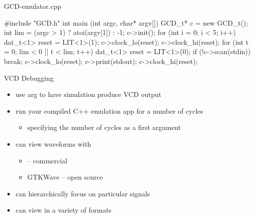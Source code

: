 \documentclass[xcolor=pdflatex,dvipsnames,table]{beamer}
\begin{document}
\begin{frame}[fragile]{GCD-emulator.cpp}
\begin{scala}
#include "GCD.h"
int main (int argc, char* argv[]) {
  GCD_t* c = new GCD_t();
  int lim = (argc > 1) ? atoi(argv[1]) : -1;
  c->init();
  for (int i = 0; i < 5; i++) {
    dat_t<1> reset = LIT<1>(1);
    c->clock_lo(reset);
    c->clock_hi(reset);
  }
  for (int t = 0; lim < 0 || t < lim; t++) {
    dat_t<1> reset = LIT<1>(0);
    if (!c->scan(stdin)) break;
    c->clock_lo(reset);
    c->print(stdout);
    c->clock_hi(reset);
  }
}
\end{scala}
\end{frame}

\begin{frame}[fragile]{VCD Debugging}
\begin{itemize}
\item use  arg to have simulation produce VCD output
\item run your compiled C++ emulation app for a number of cycles
\begin{itemize}
\item specifying the number of cycles as a first argument
\end{itemize}
\item can view waveforms with
\begin{itemize}
\item {} -- commercial
\item GTKWave -- open source
\end{itemize}
\item can hierarchically focus on particular signals
\item can view in a variety of formats
\end{itemize}
\end{frame}
\end{document}
